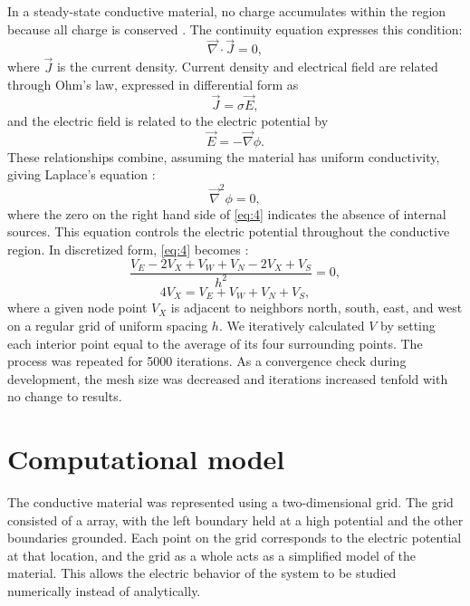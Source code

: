 \documentclass[10pt,journal,twoside]{IEEEtran} %
\begin{document}
In a steady-state conductive material, no charge accumulates within the region because all charge is conserved \cite{barrons,tipler,openstax,jackson:1999:classical}. The continuity equation expresses this condition:
\begin{equation}
\vec{\nabla}\cdot\vec{J} = 0,
\label{eq:1}
\end{equation}
where $\vec{J}$ is the current density. Current density and electrical field are related through Ohm’s law, expressed in differential form as \cite{jackson:1999:classical} 
\begin{equation}
\vec{J} = \sigma \vec{E},
\label{eq:2}
\end{equation}
and the electric field is related to the electric potential by
\begin{equation}
\vec{E} = - \vec{\nabla} \phi.
\label{eq:3}
\end{equation}
These relationships combine, assuming the material has uniform conductivity, giving Laplace’s equation \cite{jackson:1999:classical}:
\begin{equation}
\vec{\nabla}^2 \phi = 0,
\label{eq:4}
\end{equation}
where the zero on the right hand side of \cref{eq:4} indicates the absence of internal sources.  This equation controls the electric potential throughout the conductive region. In discretized form, \cref{eq:4} becomes \cite{press:1992:numerical}:
\begin{equation}
\dfrac{V_E - 2 V_X + V_W + V_N -2 V_X + V_S}{h^2} = 0,
\end{equation}
\begin{equation}
4 V_X = V_E + V_W + V_N + V_S,
\end{equation}
where a given node point $V_X$ is adjacent to neighbors north, south, east, and west on a regular grid of uniform spacing $h$. We iteratively calculated $V$ by setting each interior point equal to the average of its four surrounding points. The process was repeated for 5000 iterations. As a convergence check during development, the mesh size was decreased and iterations increased tenfold with no change to results.






\section{Computational model}
The conductive material was represented using a two-dimensional grid. The grid consisted of a  array, with the left boundary held at a high potential and the other boundaries grounded. Each point on the grid corresponds to the electric potential at that location, and the grid as a whole acts as a simplified model of the material. This allows the electric behavior of the system to be studied numerically instead of analytically.
\end{document}
